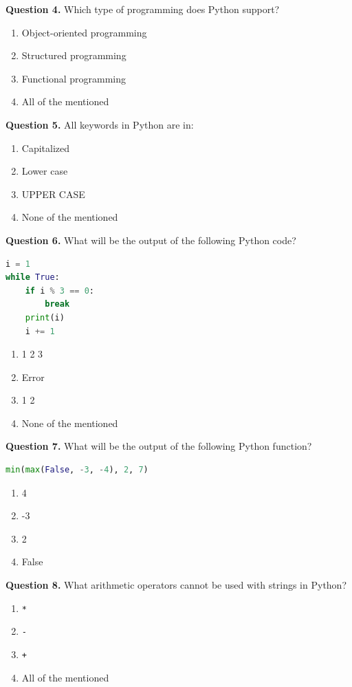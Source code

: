 \documentclass[11pt,a4paper]{article}
\begin{document}
\medskip\noindent\textbf{Question 4.} Which type of programming does Python support?
\begin{enumerate}[label=(\alph*),itemsep=2pt]
  \item Object-oriented programming
  \item Structured programming
  \item Functional programming
  \item All of the mentioned
\end{enumerate}

\medskip\noindent\textbf{Question 5.} All keywords in Python are in:
\begin{enumerate}[label=(\alph*),itemsep=2pt]
  \item Capitalized
  \item Lower case
  \item UPPER CASE
  \item None of the mentioned
\end{enumerate}

\medskip\noindent\textbf{Question 6.} What will be the output of the following Python code?
\begin{lstlisting}[language=Python]
i = 1
while True:
    if i % 3 == 0:
        break
    print(i)
    i += 1
\end{lstlisting}
\begin{enumerate}[label=(\alph*),itemsep=2pt]
  \item 1 2 3
  \item Error
  \item 1 2
  \item None of the mentioned
\end{enumerate}

\medskip\noindent\textbf{Question 7.} What will be the output of the following Python function?
\begin{lstlisting}[language=Python]
min(max(False, -3, -4), 2, 7)
\end{lstlisting}
\begin{enumerate}[label=(\alph*),itemsep=2pt]
  \item 4
  \item -3
  \item 2
  \item False
\end{enumerate}

\medskip\noindent\textbf{Question 8.} What arithmetic operators cannot be used with strings in Python?
\begin{enumerate}[label=(\alph*),itemsep=2pt]
  \item \texttt{*}
  \item \texttt{-}
  \item \texttt{+}
  \item All of the mentioned
\end{enumerate}
\end{document}
